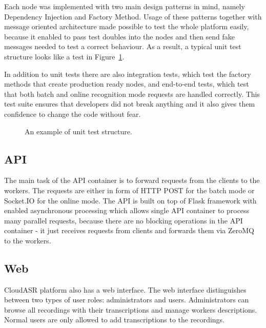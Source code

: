 Each node was implemented with two main design patterns in mind, namely Dependency Injection and Factory Method.
Usage of these patterns together with message oriented architecture made possible to test the whole platform easily,
  because it enabled to pass test doubles into the nodes
  and then send fake messages needed to test a correct behaviour.
As a result, a typical unit test structure looks like a test in Figure~\ref{fig:unit-test}.

In addition to unit tests there are also integration tests,
  which test the factory methods that create production ready nodes,
  and end-to-end tests,
  which test that both batch and online recognition mode requests are handled correctly.
This test suite ensures that developers did not break anything
  and it also gives them confidence to change the code without fear.

\begin{figure}
  

  \label{fig:unit-test}
  \caption{An example of unit test structure.}
\end{figure}


\subsection{API}
The main task of the API container is to forward requests from the clients to the workers.
The requests are either in form of HTTP POST for the batch mode or Socket.IO for the online mode.
The API is built on top of Flask framework with enabled asynchronous processing
  which allows single API container to process many parallel requests,
  because there are no blocking operations in the API container -
  it just receives requests from clients and forwards them via ZeroMQ to the workers.

\subsection{Web}
CloudASR platform also has a web interface.
The web interface distinguishes between two types of user roles: administrators and users.
Administrators can browse all recordings with their transcriptions and manage workers descriptions.
Normal users are only allowed to add transcriptions to the recordings.

